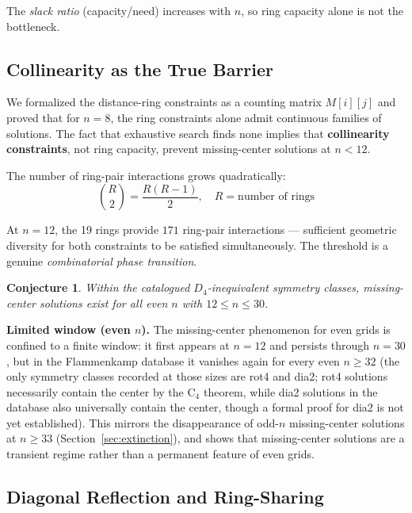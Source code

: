 \documentclass[11pt,a4paper]{article}
\theoremstyle{plain}
\newtheorem{conjecture}[theorem]{Conjecture}
\theoremstyle{definition}
\begin{document}
The \emph{slack ratio} (capacity/need) increases with $n$, so ring capacity alone is not the bottleneck.

\subsection{Collinearity as the True Barrier}

We formalized the distance-ring constraints as a counting matrix $M[i][j]$ and proved that for $n=8$, the ring constraints alone admit continuous families of solutions. The fact that exhaustive search finds none implies that \textbf{collinearity constraints}, not ring capacity, prevent missing-center solutions at $n<12$.

The number of ring-pair interactions grows quadratically:
\begin{equation}
\binom{R}{2} = \frac{R(R-1)}{2},\quad R = \text{number of rings}
\end{equation}

At $n=12$, the 19 rings provide $171$ ring-pair interactions --- sufficient geometric diversity for both constraints to be satisfied simultaneously. The threshold is a genuine \emph{combinatorial phase transition}.

\begin{conjecture}
Within the catalogued $D_4$-inequivalent symmetry classes, missing-center solutions exist for all even $n$ with $12\le n\le 30$.
\end{conjecture}

\noindent\textbf{Limited window (even $n$).} The missing-center phenomenon for even grids is confined to a finite window: it first appears at $n=12$ and persists through $n=30$, but in the Flammenkamp database it vanishes again for every even $n\ge 32$ (the only symmetry classes recorded at those sizes are rot4 and dia2; rot4 solutions necessarily contain the center by the C$_4$ theorem, while dia2 solutions in the database also universally contain the center, though a formal proof for dia2 is not yet established). This mirrors the disappearance of odd-$n$ missing-center solutions at $n\ge 33$ (Section~\ref{sec:extinction}), and shows that missing-center solutions are a transient regime rather than a permanent feature of even grids.

\subsection{Diagonal Reflection and Ring-Sharing}
\end{document}
